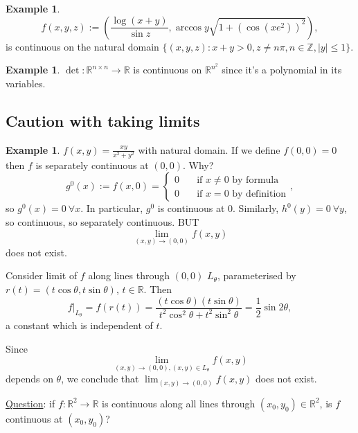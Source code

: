 \documentclass[a4paper]{article}
\theoremstyle{definition}
\newtheorem{eg}[defn]{Example}
\begin{document}
\begin{eg}
\[
f(x,y,z):=\left(\frac{\log (x+y)}{\sin z}, \arccos y \sqrt{1+\left(\cos (xe^2)\right)^2} \right),
\]
is continuous on the natural domain $\{ (x,y,z):x+y>0, z \neq n\pi, n\in \mathbb Z, |y|\leq 1 \}.$
\end{eg}

\begin{eg}
	$\det : \mathbb R^{n\times n}\rightarrow \mathbb R$ is continuous on $\mathbb R^{n^2}$ since it's a polynomial in its variables.
\end{eg}

\subsection{Caution with taking limits}
\begin{eg}
	$f(x,y)=\frac{xy}{x^2+y^2}$ with natural domain. If we define $f(0,0)=0$ then $f$ is separately continuous at $(0,0)$. Why?
\[
g^0(x):=f(x,0)=\left\{\begin{aligned}
		0\quad &\text{if } x\neq 0 \text{ by formula} \\ 0\quad &\text{if } x= 0 \text{ by definition}
	\end{aligned} \right. ,
\]
so $g^0(x)=0 \ \forall x$. In particular, $g^0$ is continuous at 0. Similarly, $h^0(y)=0 \ \forall y$, so continuous, so separately continuous. BUT
\[
\lim_{(x,y)\rightarrow (0,0)} f(x,y)
\]
does not exist. 

	Consider limit of $f$ along lines through $(0,0)$ $L_{\theta}$, parameterised by $r(t)=(t\cos \theta, t\sin \theta)$, $t\in \mathbb R$. Then
\[
\left. f \right|_{L_{\theta}} = f(r(t)) = \frac{(t\cos \theta)(t\sin \theta)}{t^2\cos ^2 \theta + t^2\sin ^2 \theta} = \frac12 \sin 2 \theta ,
\]
a constant which is independent of $t$.

	Since
\[
\lim_{(x,y)\rightarrow (0,0), (x,y)\in L_{\theta}} f(x,y)
\]
depends on $\theta$, we conclude that $\lim_{(x,y)\rightarrow (0,0)} f(x,y)$ does not exist.
\end{eg}

\underline{Question}: if $f:\mathbb R^2 \rightarrow \mathbb R$ is continuous along all lines through $(x_0,y_0)\in \mathbb R^2$, is $f$ continuous at $(x_0,y_0)$?
\end{document}
